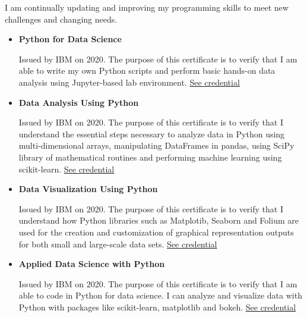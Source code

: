 \documentclass[letterpaper, 11pt]{article}[leftmargin=*]
\newcommand{\resumeItemListStart}{\begin{itemize}[leftmargin=4.5mm]\itemsep-3pt}
\newcommand{\resumeItemListEnd}{\end{itemize}}
\newcommand{\resumeItem}[1]{
  \item\small{
    {#1}
  }
}
\begin{document}
\vspace{0.15cm}
{\footnotesize I am continually updating and improving my programming skills to meet new challenges and changing needs.}
\vspace{-0.1cm}
\resumeItemListStart
\resumeItem{\textbf{Python for Data Science}\par
\vspace{-0.1cm}
{\footnotesize Issued by IBM on 2020. The purpose of this certificate is to verify that I am able to write my own Python scripts and perform basic hands-on data analysis using Jupyter-based lab environment. \href{https://www.youracclaim.com/badges/0f8785bb-1050-4da5-8dd3-15d8bf1d68a8}{See credential \faExternalLink}}}
\vspace{0.1cm}
\resumeItem{\textbf{Data Analysis Using Python}\par
\vspace{-0.1cm}
{\footnotesize Issued by IBM on 2020. The purpose of this certificate is to verify that I understand the essential steps necessary to analyze data in Python using multi-dimensional arrays, manipulating DataFrames in pandas, using SciPy library of mathematical routines and performing machine learning using scikit-learn. \href{https://www.youracclaim.com/badges/6254609b-3350-47b3-83e9-d7e6ff2a1daa}{See credential \faExternalLink}}}
\vspace{0.1cm}
\resumeItem{\textbf{Data Visualization Using Python}\par
\vspace{-0.1cm}
{\footnotesize Issued by IBM on 2020. The purpose of this certificate is to verify that I understand how Python libraries such as Matplotib, Seaborn and Folium are used for the creation and customization of graphical representation outputs for both small and large-scale data sets. \href{https://www.youracclaim.com/badges/6e5beb76-93e0-4f62-9a4d-6de24671215f}{See credential \faExternalLink}}}
\vspace{0.1cm}
\resumeItem{\textbf{Applied Data Science with Python}\par
\vspace{-0.1cm}
{\footnotesize Issued by IBM on 2020. The purpose of this certificate is to verify that I am able to code in Python for data science. I can analyze and visualize data with Python with packages like scikit-learn, matplotlib and bokeh. \href{https://www.youracclaim.com/badges/fb8ee1fc-0a04-4027-ad0e-21179858d327}{See credential \faExternalLink}}}
\resumeItemListEnd

\end{document}
